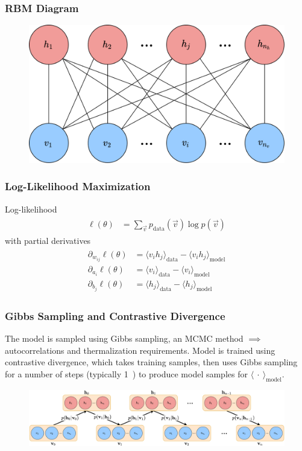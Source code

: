 \documentclass{beamer}
\begin{document}
\begin{frame}
    \frametitle{RBM Diagram}
    \begin{figure}
        \includegraphics[width=1\linewidth]{rbm_diagram.png}
    \end{figure}
\end{frame}

\begin{frame}
    \frametitle{Log-Likelihood Maximization}
    Log-likelihood
    \begin{align}
    \begin{split}
        \ell(\theta)
            &= \sum_{\vec{v}} p_{\text{data}}(\vec{v}) \log p(\vec{v})
    \end{split}
    \end{align}
    with partial derivatives
    \begin{align}
    \begin{split}
        \partial_{w_{ij}} \ell(\theta)
            &= \langle v_i h_j \rangle_{\text{data}} - \langle v_i h_j \rangle_{\text{model}} \\
        \partial_{a_i} \ell(\theta)
            &= \langle v_i \rangle_{\text{data}} - \langle v_i \rangle_{\text{model}} \\
        \partial_{b_j} \ell(\theta)
            &= \langle h_j \rangle_{\text{data}} - \langle h_j \rangle_{\text{model}}
    \end{split}
    \end{align}
\end{frame}

\begin{frame}
    \frametitle{Gibbs Sampling and Contrastive Divergence}
    The model is sampled using Gibbs sampling, an MCMC method \( \implies \) autocorrelations and thermalization requirements.
    Model is trained using contrastive divergence, which takes training samples, then uses Gibbs sampling for a number of steps (typically 1~\cite{hinton_rbm_training}) to produce model samples for \( \langle \ \cdot \ \rangle_\text{model} \).
    \begin{figure}
        \includegraphics[width=1\linewidth]{gibbs_sampling_diagram.png}
    \end{figure}
\end{frame}
\end{document}
